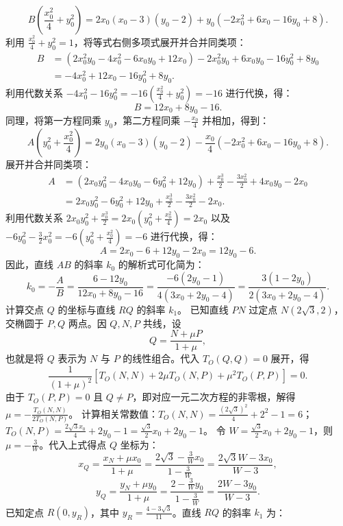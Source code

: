 \begin{solution}
\[ B \left( \frac{x_0^2}{4} + y_0^2 \right) = 2 x_0 (x_0 - 3)(y_0 - 2) + y_0 (-2 x_0^2 + 6 x_0 - 16 y_0 + 8). \]
利用 $\frac{x_0^2}{4} + y_0^2 = 1$，将等式右侧多项式展开并合并同类项：
\begin{align*}
B &= (2 x_0^2 y_0 - 4 x_0^2 - 6 x_0 y_0 + 12 x_0) - 2 x_0^2 y_0 + 6 x_0 y_0 - 16 y_0^2 + 8 y_0 \\
&= -4 x_0^2 + 12 x_0 - 16 y_0^2 + 8 y_0.
\end{align*}
利用代数关系 $-4 x_0^2 - 16 y_0^2 = -16\left(\frac{x_0^2}{4} + y_0^2\right) = -16$ 进行代换，得：
\[ B = 12 x_0 + 8 y_0 - 16. \]
同理，将第一方程同乘 $y_0$，第二方程同乘 $-\frac{x_0}{4}$ 并相加，得到：
\[ A \left( y_0^2 + \frac{x_0^2}{4} \right) = 2 y_0 (x_0 - 3)(y_0 - 2) - \frac{x_0}{4} (-2 x_0^2 + 6 x_0 - 16 y_0 + 8). \]
展开并合并同类项：
\begin{align*}
A &= (2 x_0 y_0^2 - 4 x_0 y_0 - 6 y_0^2 + 12 y_0) + \frac{x_0^3}{2} - \frac{3 x_0^2}{2} + 4 x_0 y_0 - 2 x_0 \\
&= 2 x_0 y_0^2 - 6 y_0^2 + 12 y_0 + \frac{x_0^3}{2} - \frac{3 x_0^2}{2} - 2 x_0.
\end{align*}
利用代数关系 $2 x_0 y_0^2 + \frac{x_0^3}{2} = 2 x_0\left(y_0^2 + \frac{x_0^2}{4}\right) = 2 x_0$ 以及 $-6 y_0^2 - \frac{3}{2} x_0^2 = -6\left(y_0^2 + \frac{x_0^2}{4}\right) = -6$ 进行代换，得：
\[ A = 2 x_0 - 6 + 12 y_0 - 2 x_0 = 12 y_0 - 6. \]
因此，直线 $AB$ 的斜率 $k_0$ 的解析式可化简为：
\[ k_0 = -\frac{A}{B} = \frac{6 - 12 y_0}{12 x_0 + 8 y_0 - 16} = \frac{-6(2 y_0 - 1)}{4(3 x_0 + 2 y_0 - 4)} = \frac{3(1 - 2 y_0)}{2(3 x_0 + 2 y_0 - 4)}. \]
计算交点 $Q$ 的坐标与直线 $RQ$ 的斜率 $k_1$。
已知直线 $PN$ 过定点 $N(2\sqrt{3}, 2)$，交椭圆于 $P, Q$ 两点。因 $Q, N, P$ 共线，设
$$Q = \frac{N + \mu P}{1 + \mu},$$
也就是将 $Q$ 表示为 $N$ 与 $P$ 的线性组合。代入 $T_O(Q, Q) = 0$ 展开，得
\[ \frac{1}{(1+\mu)^2} \left[ T_O(N, N) + 2\mu T_O(N, P) + \mu^2 T_O(P, P) \right] = 0. \]
由于 $T_O(P, P) = 0$ 且 $Q \neq P$，即对应一元二次方程的非零根，解得 $\mu = -\frac{T_O(N, N)}{2 T_O(N, P)}$。
计算相关常数值：$T_O(N, N) = \frac{(2\sqrt{3})^2}{4} + 2^2 - 1 = 6$；$T_O(N, P) = \frac{2\sqrt{3} x_0}{4} + 2 y_0 - 1 = \frac{\sqrt{3}}{2} x_0 + 2 y_0 - 1$。
令 $W = \frac{\sqrt{3}}{2} x_0 + 2 y_0 - 1$，则 $\mu = -\frac{3}{W}$。代入上式得点 $Q$ 坐标为：
\[ x_Q = \frac{x_N + \mu x_0}{1 + \mu} = \frac{2\sqrt{3} - \frac{3}{W} x_0}{1 - \frac{3}{W}} = \frac{2\sqrt{3} W - 3 x_0}{W - 3}, \]
\[ y_Q = \frac{y_N + \mu y_0}{1 + \mu} = \frac{2 - \frac{3}{W} y_0}{1 - \frac{3}{W}} = \frac{2 W - 3 y_0}{W - 3}. \]
已知定点 $R(0, y_R)$，其中 $y_R = \frac{4 - 3\sqrt{3}}{11}$。直线 $RQ$ 的斜率 $k_1$ 为：

\end{solution}
